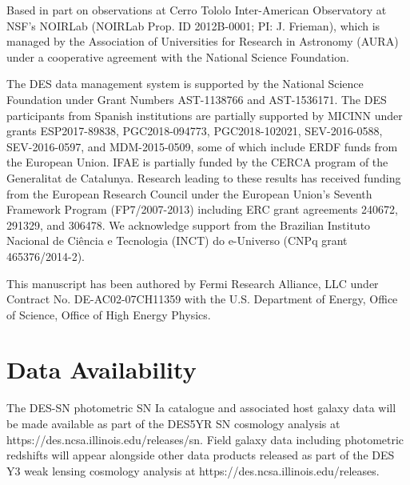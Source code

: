 \documentclass[fleqn,usenatbib]{mnras}
\begin{document}
Based in part on observations at Cerro Tololo Inter-American Observatory at NSF's NOIRLab (NOIRLab Prop. ID 2012B-0001; PI: J. Frieman), which is managed by the Association of Universities for Research in Astronomy (AURA) under a cooperative agreement with the National Science Foundation.

The DES data management system is supported by the National Science Foundation under Grant Numbers AST-1138766 and AST-1536171.
The DES participants from Spanish institutions are partially supported by MICINN under grants ESP2017-89838, PGC2018-094773, PGC2018-102021, SEV-2016-0588, SEV-2016-0597, and MDM-2015-0509, some of which include ERDF funds from the European Union. IFAE is partially funded by the CERCA program of the Generalitat de Catalunya.
Research leading to these results has received funding from the European Research
Council under the European Union's Seventh Framework Program (FP7/2007-2013) including ERC grant agreements 240672, 291329, and 306478.
We  acknowledge support from the Brazilian Instituto Nacional de Ci\^encia
e Tecnologia (INCT) do e-Universo (CNPq grant 465376/2014-2).

This manuscript has been authored by Fermi Research Alliance, LLC under Contract No. DE-AC02-07CH11359 with the U.S. Department of Energy, Office of Science, Office of High Energy Physics.

\section*{Data Availability}

 
The DES-SN photometric SN Ia catalogue and associated host galaxy data will be made available as part of the DES5YR SN cosmology analysis at https://des.ncsa.illinois.edu/releases/sn. Field galaxy data including photometric redshifts will appear alongside other data products released as part of the DES Y3 weak lensing cosmology analysis at https://des.ncsa.illinois.edu/releases.







\end{document}
